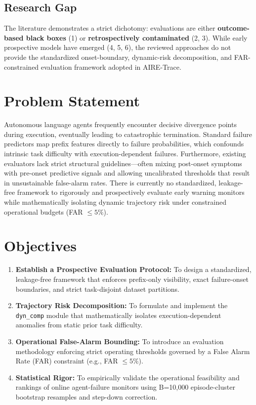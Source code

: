 \documentclass[12pt,a4paper]{article}
\begin{document}
\subsection{Research Gap}
The literature demonstrates a strict dichotomy: evaluations are either \textbf{outcome-based black boxes} (1) or \textbf{retrospectively contaminated} (2, 3). While early prospective models have emerged (4, 5, 6), the reviewed approaches do not provide the standardized onset-boundary, dynamic-risk decomposition, and FAR-constrained evaluation framework adopted in AIRE-Trace.

\newpage


\newpage

\section{Problem Statement}
Autonomous language agents frequently encounter decisive divergence points during execution, eventually leading to catastrophic termination. Standard failure predictors map prefix features directly to failure probabilities, which confounds intrinsic task difficulty with execution-dependent failures. Furthermore, existing evaluators lack strict structural guidelines---often mixing post-onset symptoms with pre-onset predictive signals and allowing uncalibrated thresholds that result in unsustainable false-alarm rates. There is currently no standardized, leakage-free framework to rigorously and prospectively evaluate early warning monitors while mathematically isolating dynamic trajectory risk under constrained operational budgets (FAR $\le 5\%$).

\newpage


\newpage

\section{Objectives}
\begin{enumerate}[label=\arabic*.]
    \item \textbf{Establish a Prospective Evaluation Protocol:} To design a standardized, leakage-free framework that enforces prefix-only visibility, exact failure-onset boundaries, and strict task-disjoint dataset partitions.
    \item \textbf{Trajectory Risk Decomposition:} To formulate and implement the \texttt{dyn\_comp} module that mathematically isolates execution-dependent anomalies from static prior task difficulty.
    \item \textbf{Operational False-Alarm Bounding:} To introduce an evaluation methodology enforcing strict operating thresholds governed by a False Alarm Rate (FAR) constraint (e.g., FAR $\le 5\%$).
    \item \textbf{Statistical Rigor:} To empirically validate the operational feasibility and rankings of online agent-failure monitors using B=10,000 episode-cluster bootstrap resamples and step-down correction.
\end{enumerate}
\end{document}
